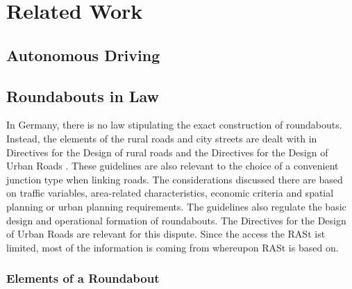 \chapter{Related Work}

\section{Autonomous Driving}

\section{Roundabouts in Law}
%
In Germany, there is no law stipulating the exact construction of roundabouts.
Instead, the elements of the rural roads and city streets are dealt with in Directives for the Design of rural roads \cite{ral13}
and the Directives for the Design of Urban Roads \cite{rast06}. These guidelines are also relevant to the choice of a convenient junction type when linking roads.
The considerations discussed there are based on traffic variables, area-related characteristics, economic criteria and spatial planning or urban planning requirements. 
The guidelines also regulate the basic design and operational formation of roundabouts.
The  Directives for the Design of Urban Roads \cite{rast06} are relevant for this dispute. Since the access the RASt ist limited, most of the information is coming from
\cite{man06} whereupon RASt is based on.
\subsection{Elements of a Roundabout}


